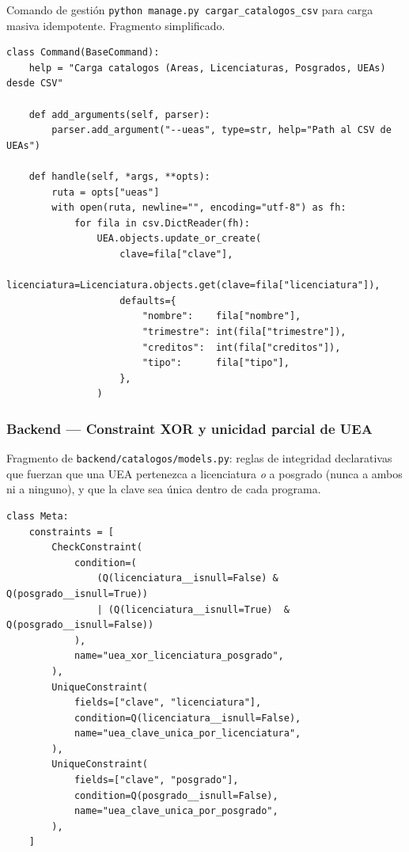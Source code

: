 Comando de gestión \texttt{python manage.py cargar\_catalogos\_csv} para carga masiva idempotente. Fragmento simplificado.

\begin{lstlisting}[language={[3]Python}]
class Command(BaseCommand):
    help = "Carga catalogos (Areas, Licenciaturas, Posgrados, UEAs) desde CSV"

    def add_arguments(self, parser):
        parser.add_argument("--ueas", type=str, help="Path al CSV de UEAs")

    def handle(self, *args, **opts):
        ruta = opts["ueas"]
        with open(ruta, newline="", encoding="utf-8") as fh:
            for fila in csv.DictReader(fh):
                UEA.objects.update_or_create(
                    clave=fila["clave"],
                    licenciatura=Licenciatura.objects.get(clave=fila["licenciatura"]),
                    defaults={
                        "nombre":    fila["nombre"],
                        "trimestre": int(fila["trimestre"]),
                        "creditos":  int(fila["creditos"]),
                        "tipo":      fila["tipo"],
                    },
                )
\end{lstlisting}

\subsubsection{Backend --- Constraint XOR y unicidad parcial de UEA}\label{lst:uea_constraints}

Fragmento de \texttt{backend/catalogos/models.py}: reglas de integridad declarativas que fuerzan que una UEA pertenezca a licenciatura \emph{o} a posgrado (nunca a ambos ni a ninguno), y que la clave sea única dentro de cada programa.

\begin{lstlisting}[language={[3]Python}]
class Meta:
    constraints = [
        CheckConstraint(
            condition=(
                (Q(licenciatura__isnull=False) & Q(posgrado__isnull=True))
                | (Q(licenciatura__isnull=True)  & Q(posgrado__isnull=False))
            ),
            name="uea_xor_licenciatura_posgrado",
        ),
        UniqueConstraint(
            fields=["clave", "licenciatura"],
            condition=Q(licenciatura__isnull=False),
            name="uea_clave_unica_por_licenciatura",
        ),
        UniqueConstraint(
            fields=["clave", "posgrado"],
            condition=Q(posgrado__isnull=False),
            name="uea_clave_unica_por_posgrado",
        ),
    ]
\end{lstlisting}


